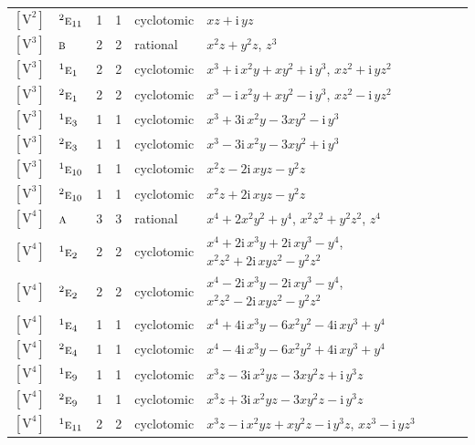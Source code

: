 \documentclass[10pt,a4paper]{article}
\numberwithin{equation}{section}
\newcommand{\irr}[1]{\text{\normalfont\scshape #1}}
\newcommand{\conjpair}[1]{{}^{#1}}
\newcommand{\iunit}{\mathrm{i}}
\newcommand{\jahn}[1]{\mathrm{#1}}
\newlength{\fillwidth}\newlength{\cellwidth}\newlength{\colwidth}
\begin{document}
{\begin{longtable}{@{}llrrl>{\RaggedRight\arraybackslash}p{\fillwidth}@{}}
$\jahn{[V^{2}]}$ & $\conjpair{2}\irr{e}_{11}$ & 1 & 1 & cyclotomic & $xz + \iunit{}\,yz$\\
$\jahn{[V^{3}]}$ & $\irr{b}$ & 2 & 2 & rational & $x^{2}z + y^{2}z$, $z^{3}$\\
$\jahn{[V^{3}]}$ & $\conjpair{1}\irr{e}_{1}$ & 2 & 2 & cyclotomic & $x^{3} + \iunit{}\,x^{2}y + xy^{2} + \iunit{}\,y^{3}$, $xz^{2} + \iunit{}\,yz^{2}$\\
$\jahn{[V^{3}]}$ & $\conjpair{2}\irr{e}_{1}$ & 2 & 2 & cyclotomic & $x^{3} - \iunit{}\,x^{2}y + xy^{2} - \iunit{}\,y^{3}$, $xz^{2} - \iunit{}\,yz^{2}$\\
$\jahn{[V^{3}]}$ & $\conjpair{1}\irr{e}_{3}$ & 1 & 1 & cyclotomic & $x^{3} + 3\iunit{}\,x^{2}y - 3xy^{2} - \iunit{}\,y^{3}$\\
$\jahn{[V^{3}]}$ & $\conjpair{2}\irr{e}_{3}$ & 1 & 1 & cyclotomic & $x^{3} - 3\iunit{}\,x^{2}y - 3xy^{2} + \iunit{}\,y^{3}$\\
$\jahn{[V^{3}]}$ & $\conjpair{1}\irr{e}_{10}$ & 1 & 1 & cyclotomic & $x^{2}z - 2\iunit{}\,xyz - y^{2}z$\\
$\jahn{[V^{3}]}$ & $\conjpair{2}\irr{e}_{10}$ & 1 & 1 & cyclotomic & $x^{2}z + 2\iunit{}\,xyz - y^{2}z$\\
$\jahn{[V^{4}]}$ & $\irr{a}$ & 3 & 3 & rational & $x^{4} + 2x^{2}y^{2} + y^{4}$, $x^{2}z^{2} + y^{2}z^{2}$, $z^{4}$\\
$\jahn{[V^{4}]}$ & $\conjpair{1}\irr{e}_{2}$ & 2 & 2 & cyclotomic & $x^{4} + 2\iunit{}\,x^{3}y + 2\iunit{}\,xy^{3} - y^{4}$, $x^{2}z^{2} + 2\iunit{}\,xyz^{2} - y^{2}z^{2}$\\
$\jahn{[V^{4}]}$ & $\conjpair{2}\irr{e}_{2}$ & 2 & 2 & cyclotomic & $x^{4} - 2\iunit{}\,x^{3}y - 2\iunit{}\,xy^{3} - y^{4}$, $x^{2}z^{2} - 2\iunit{}\,xyz^{2} - y^{2}z^{2}$\\
$\jahn{[V^{4}]}$ & $\conjpair{1}\irr{e}_{4}$ & 1 & 1 & cyclotomic & $x^{4} + 4\iunit{}\,x^{3}y - 6x^{2}y^{2} - 4\iunit{}\,xy^{3} + y^{4}$\\
$\jahn{[V^{4}]}$ & $\conjpair{2}\irr{e}_{4}$ & 1 & 1 & cyclotomic & $x^{4} - 4\iunit{}\,x^{3}y - 6x^{2}y^{2} + 4\iunit{}\,xy^{3} + y^{4}$\\
$\jahn{[V^{4}]}$ & $\conjpair{1}\irr{e}_{9}$ & 1 & 1 & cyclotomic & $x^{3}z - 3\iunit{}\,x^{2}yz - 3xy^{2}z + \iunit{}\,y^{3}z$\\
$\jahn{[V^{4}]}$ & $\conjpair{2}\irr{e}_{9}$ & 1 & 1 & cyclotomic & $x^{3}z + 3\iunit{}\,x^{2}yz - 3xy^{2}z - \iunit{}\,y^{3}z$\\
$\jahn{[V^{4}]}$ & $\conjpair{1}\irr{e}_{11}$ & 2 & 2 & cyclotomic & $x^{3}z - \iunit{}\,x^{2}yz + xy^{2}z - \iunit{}\,y^{3}z$, $xz^{3} - \iunit{}\,yz^{3}$\\

\end{longtable}}
\end{document}
